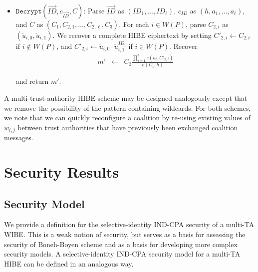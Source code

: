 \documentclass[10pt]{llncs}
\newcommand{\ID}{\mathit{ID}}
\begin{document}
\begin{itemize}
\item $\texttt{Decrypt}(\vec{\ID},c_{\vec{\ID}},C)$: Parse $\vec{\ID}$
as $(\ID_{1},\ldots,\ID_{\ell})$, $c_{\ID}$ as
$(h,a_{1},\ldots,a_{\ell})$, and $C$ as
$(C_{1},C_{2,1},\ldots,C_{2,\ell},C_{3})$. For each $i\in W(P)$,
parse $C_{2,i}$ as $(\tilde{u}_{i,0},\tilde{u}_{i,1})$. We
recover a complete HIBE ciphertext by setting $C'_{2,i} \gets
C_{2,i}$ if $i\notin W(P)$, and $C'_{2,i}\gets \tilde{u}_{i,0}
\cdot \tilde{u}_{i,1}^{\ID_{i}}$ if $i\in W(P)$. Recover
\begin{eqnarray*}
    m' & \gets & C_{3} \frac{\prod_{i=1}^{\ell} e(a_{i},C'_{2,i})}{e(C_{1},h)}
\end{eqnarray*}

and return $m'$.
\end{itemize}

A multi-trust-authority HIBE scheme may be designed analogously
except that we remove the possibility of the pattern containing
wildcards. For both schemes, we note that we can quickly reconfigure
a coalition by re-using existing values of $w_{i,j}$ between trust
authorities that have previously been exchanged coalition messages.

\section{Security Results}

\subsection{Security Model}

We provide a definition for the selective-identity IND-CPA security
of a multi-TA WIBE. This is a weak notion of security, but serves as
a basis for assessing the security of Boneh-Boyen scheme and as a
basis for developing more complex security models. A
selective-identity IND-CPA security model for a multi-TA HIBE can be
defined in an analogous way.
\end{document}
